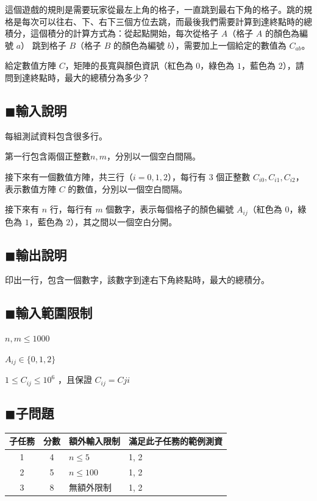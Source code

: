 \documentclass[12pt,a4paper]{article}
\begin{document}
這個遊戲的規則是需要玩家從最左上角的格子，一直跳到最右下角的格子。跳的規格是每次可以往右、下、右下三個方位去跳，而最後我們需要計算到達終點時的總積分，這個積分的計算方式為：從起點開始，每次從格子 $A$（格子 $A$ 的顏色為編號 $a$） 跳到格子 $B$（格子 $B$ 的顏色為編號 $b$），需要加上一個給定的數值為 $C_{ab}$。\par

給定數值方陣 $C$，矩陣的長寬與顏色資訊（紅色為 $0$，綠色為 $1$，藍色為 $2$），請問到達終點時，最大的總積分為多少？\par

\subsection*{$\blacksquare$輸入說明}
每組測試資料包含很多行。\par
第一行包含兩個正整數\(n,m\)，分別以一個空白間隔。\par
接下來有一個數值方陣，共三行（$i = 0, 1, 2$），每行有 $3$ 個正整數 $C_{i0}, C_{i1}, C_{i2}$，表示數值方陣 $C$ 的數值，分別以一個空白間隔。\par
接下來有 $n$ 行，每行有 $m$ 個數字，表示每個格子的顏色編號 $A_{ij} $（紅色為 $0$，綠色為 $1$，藍色為 $2$），其之間以一個空白分開。

\subsection*{$\blacksquare$輸出說明}
印出一行，包含一個數字，該數字到達右下角終點時，最大的總積分。\par

\subsection*{$\blacksquare$輸入範圍限制}
\(n, m \leq 1000 \) \par
\(A_{ij} \in \{0, 1, 2\} \) \par
\(1 \leq C_{ij} \leq 10^{6} \) ，且保證 $C_{ij} = C{ji}$ \par 



\subsection*{$\blacksquare$子問題}
\begin{table}[h]
\centering
\begin{tabular}{ccll}
\toprule[1.5pt]
\textbf{子任務}&\textbf{分數}&\multicolumn{1}{c}{\textbf{額外輸入限制}}&\multicolumn{1}{c}{\textbf{滿足此子任務的範例測資}}\\
\midrule[1.5pt]
1&4& $n \leq 5 $ &1, 2\\
\midrule[0.75pt]
2&5& $n \leq 100 $ &1, 2\\
\midrule[0.75pt]
3&8& 無額外限制&1, 2\\
\bottomrule[1.5pt]
\end{tabular}
\end{table}
\end{document}

